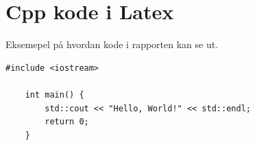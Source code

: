 \chapter{Cpp kode i Latex}

Eksemepel på hvordan kode i rapporten kan se ut. 


\begin{lstlisting}[style=cpp, caption=Example C++ Code]
    #include <iostream>
    
    int main() {
        std::cout << "Hello, World!" << std::endl;
        return 0;
    }
\end{lstlisting}